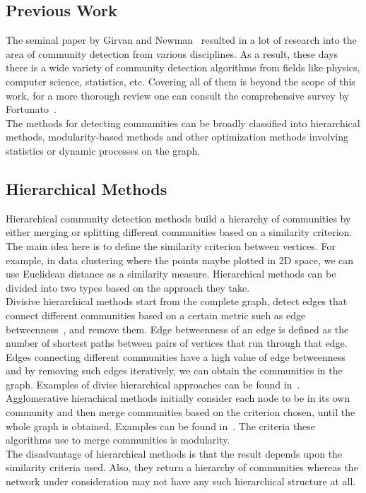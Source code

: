 \begin{spacing}{1.5}
\section{Previous Work}
The seminal paper by Girvan and Newman~\cite{Girvan11062002} resulted in a lot of research into the area of community detection from various disciplines. As a result, these days there is a wide variety of community detection algorithms from fields like physics, computer science, statistics, etc. Covering all of them is beyond the scope of this work, for a more thorough review one can consult the comprehensive survey by Fortunato~\cite{Fortunato201075}.\\
\indent The methods for detecting communities can be broadly classified into hierarchical methods, modularity-based methods and other optimization methods involving statistics or dynamic processes on the graph.
\subsection{Hierarchical Methods}
Hierarchical community detection methods build a hierarchy of communities by either merging or splitting different communities based on a similarity criterion. The main idea here is to define the similarity criterion between vertices. For example, in data clustering where the points maybe plotted in 2D space, we can use Euclidean distance as a similarity measure. Hierarchical methods can be divided into two types based on the approach they take.\\
\indent Divisive hierarchical methods start from the complete graph, detect edges that connect different communities based on a certain metric such as edge betweenness~\cite{Girvan11062002}, and remove them. Edge betweenness of an edge is defined as the number of shortest paths between pairs of vertices that run through that edge. Edges connecting different communities have a high value of edge betweenness and by removing such edges iteratively, we can obtain the communities in the graph. Examples of divise hierarchical approaches can be found in~\cite{Girvan11062002, Radicchi02032004, PhysRevE.69.026113}.\\
\indent Agglomerative hierachical methods initially consider each node to be in its own community and then merge communities based on the criterion chosen, until the whole graph is obtained. Examples can be found in~\cite{newman03fast, blondel2008fuc, Clauset2004}. The criteria these algorithms use to merge communities is modularity.\\
\indent The disadvantage of hierarchical methods is that the result depends upon the similarity criteria used. Also, they return a hierarchy of communities whereas the network under consideration may not have any such hierarchical structure at all.

\end{spacing}
